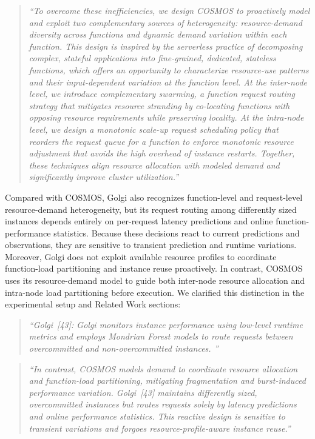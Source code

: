 \documentclass[11pt]{article}
\newenvironment{revisionquote}{\begin{quote}\itshape}{\end{quote}}
\begin{document}
\begin{revisionquote}
``To overcome these inefficiencies, we design COSMOS to proactively model and exploit two complementary sources of heterogeneity: resource-demand diversity across functions and dynamic demand variation within each function. This design is inspired by the serverless practice of decomposing complex, stateful applications into fine-grained, dedicated, stateless functions, which offers an opportunity to characterize resource-use patterns and their input-dependent variation at the function level. At the inter-node level, we introduce complementary swarming, a function request routing strategy that mitigates resource stranding by co-locating functions with opposing resource requirements while preserving locality. At the intra-node level, we design a monotonic scale-up request scheduling policy that reorders the request queue for a function to enforce monotonic resource adjustment that avoids the high overhead of instance restarts. Together, these techniques align resource allocation with modeled demand and significantly improve cluster utilization.''
\end{revisionquote}

Compared with COSMOS, Golgi also recognizes function-level and request-level resource-demand heterogeneity, but its request routing among differently sized instances depends entirely on per-request latency predictions and online function-performance statistics. Because these decisions react to current predictions and observations, they are sensitive to transient prediction and runtime variations. Moreover, Golgi does not exploit available resource profiles to coordinate function-load partitioning and instance reuse proactively. In contrast, COSMOS uses its resource-demand model to guide both inter-node resource allocation and intra-node load partitioning before execution. We clarified this distinction in the experimental setup and Related Work sections:

\begin{revisionquote}
``Golgi~[43]: Golgi monitors instance performance using low-level runtime metrics and employs Mondrian Forest models to route requests between overcommitted and non-overcommitted instances. ''
\end{revisionquote}

\begin{revisionquote}
``In contrast, COSMOS models demand to coordinate resource allocation and function-load partitioning, mitigating fragmentation and burst-induced performance variation. Golgi~[43] maintains differently sized, overcommitted instances but routes requests solely by latency predictions and online performance statistics. This reactive design is sensitive to transient variations and forgoes resource-profile-aware instance reuse.''
\end{revisionquote}
\end{document}
